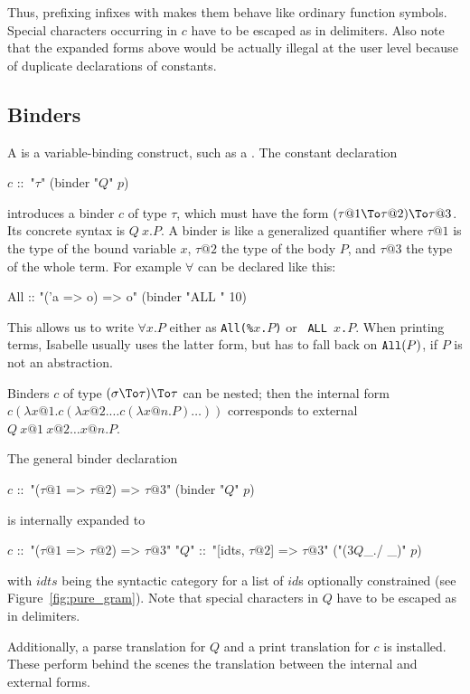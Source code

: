 Thus, prefixing infixes with  makes them behave like ordinary
function symbols. Special characters occurring in $c$ have to be escaped as
in delimiters. Also note that the expanded forms above would be actually
illegal at the user level because of duplicate declarations of constants.


\subsection{Binders}

A  is a variable-binding construct, such as a
. The constant declaration 
\begin{ttbox}
\(c\) ::\ "\(\tau\)"   (binder "\(Q\)" \(p\))
\end{ttbox}
introduces a binder $c$ of type $\tau$, which must have the form $(\tau@1 \To
\tau@2) \To \tau@3$. Its concrete syntax is $Q~x.P$. A binder is like a
generalized quantifier where $\tau@1$ is the type of the bound variable $x$,
$\tau@2$ the type of the body $P$, and $\tau@3$ the type of the whole term.
For example $\forall$ can be declared like this:
\begin{ttbox}
All :: "('a => o) => o"   (binder "ALL " 10)
\end{ttbox}
This allows us to write $\forall x.P$ either as {\tt All(\%$x$.$P$)} or {\tt
ALL $x$.$P$}. When printing terms, Isabelle usually uses the latter form, but
has to fall back on $\mbox{\tt All}(P)$, if $P$ is not an abstraction.

Binders $c$ of type $(\sigma \To \tau) \To \tau$ can be nested; then the
internal form $c(\lambda x@1. c(\lambda x@2. \ldots c(\lambda x@n. P)
\ldots))$ corresponds to external $Q~x@1~x@2 \ldots x@n. P$.

\medskip
The general binder declaration
\begin{ttbox}
\(c\) ::\ "(\(\tau@1\) => \(\tau@2\)) => \(\tau@3\)"   (binder "\(Q\)" \(p\))
\end{ttbox}
is internally expanded to
\begin{ttbox}
\(c\)   ::\ "(\(\tau@1\) => \(\tau@2\)) => \(\tau@3\)"
"\(Q\)" ::\ "[idts, \(\tau@2\)] => \(\tau@3\)"   ("(3\(Q\)_./ _)" \(p\))
\end{ttbox}
with $idts$ being the syntactic category for a list of $id$s optionally
constrained (see Figure~\ref{fig:pure_gram}). Note that special characters in
$Q$ have to be escaped as in delimiters.

Additionally, a parse translation for $Q$
and a print translation for $c$ is
installed. These perform behind the scenes the translation between the
internal and external forms.



